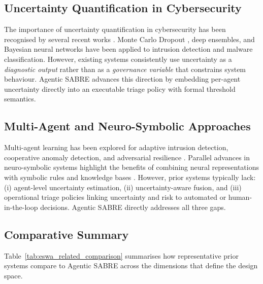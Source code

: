 \subsection{Uncertainty Quantification in Cybersecurity}

The importance of uncertainty quantification in cybersecurity has been recognised by several recent works \cite{gawlikowski2023Uncertainity, Doan2024uncertainBay}. Monte Carlo Dropout \cite{gal2016dropout}, deep ensembles, and Bayesian neural networks have been applied to intrusion detection and malware classification. However, existing systems consistently use uncertainty as a \emph{diagnostic output} rather than as a \emph{governance variable} that constrains system behaviour. Agentic SABRE advances this direction by embedding per-agent uncertainty directly into an executable triage policy with formal threshold semantics.

\subsection{Multi-Agent and Neuro-Symbolic Approaches}

Multi-agent learning has been explored for adaptive intrusion detection, cooperative anomaly detection, and adversarial resilience \cite{AdversarialCooperationLLM2024, MultiAgentAdaptiveDetection2023}. Parallel advances in neuro-symbolic systems highlight the benefits of combining neural representations with symbolic rules and knowledge bases \cite{Besold2021neurosymbolicsurvey, YangSBK25}. However, prior systems typically lack: (i) agent-level uncertainty estimation, (ii) uncertainty-aware fusion, and (iii) operational triage policies linking uncertainty and risk to automated or human-in-the-loop decisions. Agentic SABRE directly addresses all three gaps.

\subsection{Comparative Summary}

Table~\ref{tab:eswa_related_comparison} summarises how representative prior systems compare to Agentic SABRE across the dimensions that define the design space.

